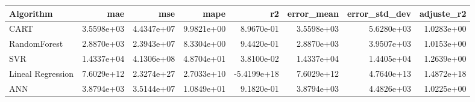 \begin{tabular}{lrrrrrrr}
\toprule
Algorithm & mae & mse & mape & r2 & error_mean & error_std_dev & adjuste_r2 \\
\midrule
CART & 3.5598e+03 & 4.4347e+07 & 9.9821e+00 & 8.9670e-01 & 3.5598e+03 & 5.6280e+03 & 1.0283e+00 \\
RandomForest & 2.8870e+03 & 2.3943e+07 & 8.3304e+00 & 9.4420e-01 & 2.8870e+03 & 3.9507e+03 & 1.0153e+00 \\
SVR & 1.4337e+04 & 4.1306e+08 & 4.8704e+01 & 3.8100e-02 & 1.4337e+04 & 1.4405e+04 & 1.2639e+00 \\
Lineal Regression & 7.6029e+12 & 2.3274e+27 & 2.7033e+10 & -5.4199e+18 & 7.6029e+12 & 4.7640e+13 & 1.4872e+18 \\
ANN & 3.8794e+03 & 3.5144e+07 & 1.0849e+01 & 9.1820e-01 & 3.8794e+03 & 4.4826e+03 & 1.0225e+00 \\
\bottomrule
\end{tabular}
